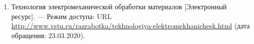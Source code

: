 \begin{enumerate}
\item 
Технология электромеханической обработки материалов [Электронный ресурс]. — Режим доступа: URL \url{http://www.vstu.ru/razrabotka/tekhnologiya-elektromekhanichesk.html} (дата обращения: 23.03.2020).

%
%
%
%
%
%
%
%
%

\end{enumerate}
